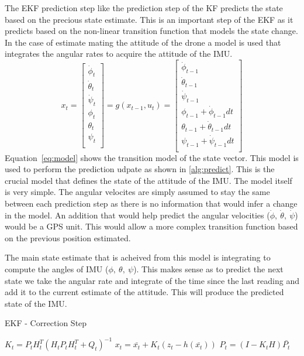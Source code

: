 \documentclass[letter]{IEEEtran}
\begin{document}
The EKF prediction step like the prediction step of the KF predicts the state based on the precious state estimate. This is an important step of the EKF as it predicts based on the non-linear transition function that models the state change. In the case of estimate mating the attitude of the drone a model is used that integrates the angular rates to acquire the attitude of the IMU.
\begin{equation}
\label{eq:model}
x_t = 
\begin{bmatrix}
  \dot{\phi}_{t} \\
  \dot{\theta}_{t}\\
  \dot{\psi}_{t}\\
  \phi_{t}\\
  \theta_{t}\\
  \psi_{t}\\
\end{bmatrix}
= g(x_{t-1}, u_t) =
\begin{bmatrix}
  \dot{\phi}_{t-1} \\
  \dot{\theta}_{t-1}\\
  \dot{\psi}_{t-1}\\
  \phi_{t-1} + \dot{\phi}_{t-1} dt\\
  \theta_{t-1} + \dot{\theta}_{t-1} dt\\
  \psi_{t-1} + \dot{\psi}_{t-1} dt\\
\end{bmatrix}
\end{equation}
Equation~\ref{eq:model} shows the transition model of the state vector. This model is used to perform the prediction udpate as shown in \ref{alg:predict}. This is the crucial model that defines the state of the attitude of the IMU. The model itself is very simple. The angular velocites are simply assumed to stay the same between each prediction step as there is no information that would infer a change in the model. An addition that would help predict the angular velocities ($\dot\phi,~\dot\theta,~\dot\psi$) would be a GPS unit. This would allow a more complex transition function based on the previous position estimated.

The main state estimate that is acheived from this model is integrating to compute the angles of IMU ($\phi,~\theta,~\psi$). This makes sense as to predict the next state we take the angular rate and integrate of the time since the last reading and add it to the current estimate of the attitude. This will produce the predicted state of the IMU.

\begin{algorithm}
\caption{EKF - Correction Step}
\begin{algorithmic}[1]
\STATE $K_t = P_t H_t^T (H_t P_t H_t^T + Q_t)^{-1}$
\STATE $x_t = \bar{x_t} + K_t (z_t - h(\bar{x_t}))$
\STATE $P_t = (I - K_t H) \bar{P_t}$
\end{algorithmic}
\label{alg:correct}
\end{algorithm}
\end{document}
